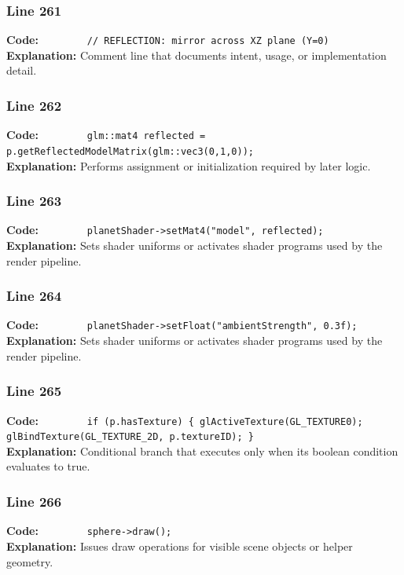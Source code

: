 \documentclass[11pt,a4paper]{article}
\begin{document}
\subsubsection*{Line 261}
\textbf{Code:} \verb|        // REFLECTION: mirror across XZ plane (Y=0)|\\
\textbf{Explanation:} Comment line that documents intent, usage, or implementation detail.

\subsubsection*{Line 262}
\textbf{Code:} \verb|        glm::mat4 reflected = p.getReflectedModelMatrix(glm::vec3(0,1,0));|\\
\textbf{Explanation:} Performs assignment or initialization required by later logic.

\subsubsection*{Line 263}
\textbf{Code:} \verb|        planetShader->setMat4("model", reflected);|\\
\textbf{Explanation:} Sets shader uniforms or activates shader programs used by the render pipeline.

\subsubsection*{Line 264}
\textbf{Code:} \verb|        planetShader->setFloat("ambientStrength", 0.3f);|\\
\textbf{Explanation:} Sets shader uniforms or activates shader programs used by the render pipeline.

\subsubsection*{Line 265}
\textbf{Code:} \verb|        if (p.hasTexture) { glActiveTexture(GL_TEXTURE0); glBindTexture(GL_TEXTURE_2D, p.textureID); }|\\
\textbf{Explanation:} Conditional branch that executes only when its boolean condition evaluates to true.

\subsubsection*{Line 266}
\textbf{Code:} \verb|        sphere->draw();|\\
\textbf{Explanation:} Issues draw operations for visible scene objects or helper geometry.
\end{document}

